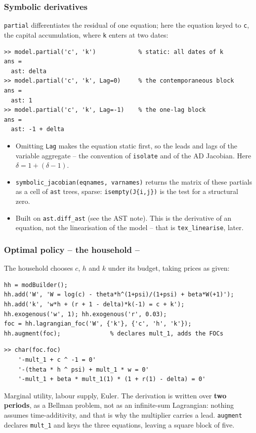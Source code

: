 \documentclass[10pt,slidestop]{beamer}
\theoremstyle{plain}
\begin{document}
\begin{frame}[c,fragile]
  \frametitle{Symbolic derivatives}

  \verb+partial+ differentiates the residual of one equation; here the equation keyed to
  \verb+c+, the capital accumulation, where \verb+k+ enters at two dates:

  \begin{lstlisting}[style=MatlabConsole,basicstyle=\ttfamily\scriptsize]
>> model.partial('c', 'k')            % static: all dates of k
ans =
  ast: delta
>> model.partial('c', 'k', Lag=0)     % the contemporaneous block
ans =
  ast: 1
>> model.partial('c', 'k', Lag=-1)    % the one-lag block
ans =
  ast: -1 + delta
  \end{lstlisting}

  \begin{itemize}\small
  \item Omitting \verb+Lag+ makes the equation static first, so the leads and lags of the
    variable aggregate -- the convention of \verb+isolate+ and of the AD Jacobian. Here
    $\delta = 1 + (\delta - 1)$.
  \item \verb+symbolic_jacobian(eqnames, varnames)+ returns the matrix of these partials as
    a cell of \verb+ast+ trees, sparse: \verb+isempty(J{i,j})+ is the test for a structural
    zero.
  \item Built on \verb+ast.diff_ast+ (see the AST note). This is the derivative of an
    equation, not the linearisation of the model -- that is \verb+tex_linearise+, later.
  \end{itemize}

\end{frame}


\begin{frame}[c,fragile]
  \frametitle{Optimal policy -- the household --}

  The household chooses $c$, $h$ and $k$ under its budget, taking prices as given:

  \begin{lstlisting}[style=MatlabConsole,basicstyle=\ttfamily\scriptsize]
hh = modBuilder();
hh.add('W', 'W = log(c) - theta*h^(1+psi)/(1+psi) + beta*W(+1)');
hh.add('k', 'w*h + (r + 1 - delta)*k(-1) = c + k');
hh.exogenous('w', 1); hh.exogenous('r', 0.03);
foc = hh.lagrangian_foc('W', {'k'}, {'c', 'h', 'k'});
hh.augment(foc);              % declares mult_1, adds the FOCs
  \end{lstlisting}

  \begin{lstlisting}[style=MatlabConsole,basicstyle=\ttfamily\scriptsize]
>> char(foc.foc)
    '-mult_1 + c ^ -1 = 0'
    '-(theta * h ^ psi) + mult_1 * w = 0'
    '-mult_1 + beta * mult_1(1) * (1 + r(1) - delta) = 0'
  \end{lstlisting}

  \small Marginal utility, labour supply, Euler. The derivation is written over
  \textbf{two periods}, as a Bellman problem, not as an infinite-sum Lagrangian: nothing
  assumes time-additivity, and that is why the multiplier carries a lead. \verb+augment+
  declares \verb+mult_1+ and keys the three equations, leaving a square block of five.

\end{frame}
\end{document}

